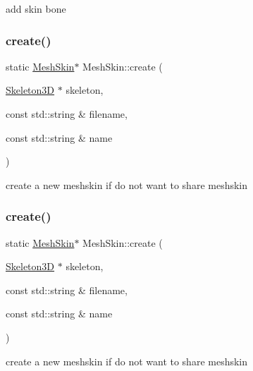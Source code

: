 add skin bone \mbox{\label{classMeshSkin_aa4f6d9cc6de56a6b5c0710ae9f83f9a7}} 
\subsubsection{\texorpdfstring{create()}{create()}\hspace{0.1cm}{\footnotesize\ttfamily [1/2]}}
{\footnotesize\ttfamily static \hyperlink{classMeshSkin}{Mesh\+Skin}$\ast$ Mesh\+Skin\+::create (\begin{DoxyParamCaption}\item[{\hyperlink{classSkeleton3D}{Skeleton3D} $\ast$}]{skeleton,  }\item[{const std\+::string \&}]{filename,  }\item[{const std\+::string \&}]{name }\end{DoxyParamCaption})\hspace{0.3cm}{\ttfamily [static]}}

create a new meshskin if do not want to share meshskin \mbox{\label{classMeshSkin_aa4f6d9cc6de56a6b5c0710ae9f83f9a7}} 
\subsubsection{\texorpdfstring{create()}{create()}\hspace{0.1cm}{\footnotesize\ttfamily [2/2]}}
{\footnotesize\ttfamily static \hyperlink{classMeshSkin}{Mesh\+Skin}$\ast$ Mesh\+Skin\+::create (\begin{DoxyParamCaption}\item[{\hyperlink{classSkeleton3D}{Skeleton3D} $\ast$}]{skeleton,  }\item[{const std\+::string \&}]{filename,  }\item[{const std\+::string \&}]{name }\end{DoxyParamCaption})\hspace{0.3cm}{\ttfamily [static]}}

create a new meshskin if do not want to share meshskin \mbox{\label{classMeshSkin_a5fda81de94dbfed1a3af0fff7806321b}} 
